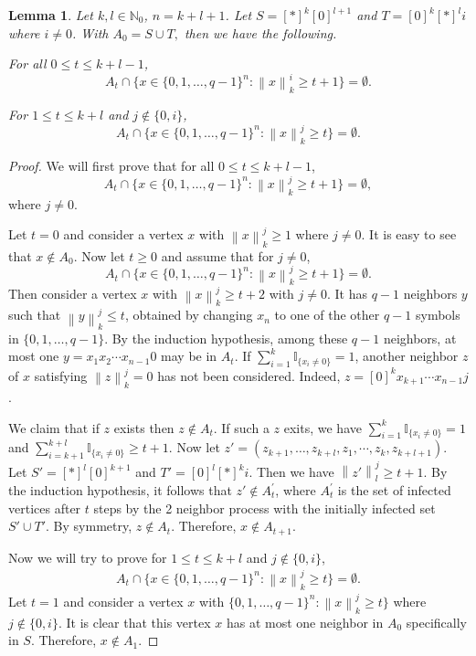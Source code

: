 \documentclass[reqno,11pt]{amsart}
\newtheorem{lemma}[theorem]{Lemma}
\renewcommand{\leq}{\leqslant}
\renewcommand{\geq}{\geqslant}
\begin{document}
\begin{lemma} \label{lemma:ST5}
Let $k,l \in \mathbb{N}_0$, $n=k+l+1$. Let $S=[*]^k[0]^{l+1}$ and $T=[0]^k[*]^li$ where $i \neq 0$. With $A_0=S \cup T,$ then we have the following.

For all $0 \leq t \leq k+l-1$,
$$A_t \cap \{x \in \{0,1,\dots,q-1\}^n: \left \lVert x \right \rVert_{k}^i \geq t+1\}=\emptyset.$$

For $1 \leq t \leq k+l$ and $j \notin \{0,i\}$,
$$A_t \cap \{x \in \{0,1,\dots,q-1\}^n: \left \lVert x \right \rVert_{k}^j \geq t\}=\emptyset.$$

\end{lemma}
\begin{proof}
We will first prove that for all $ 0 \leq t \leq k+l-1$,
$$A_t \cap \{x \in \{0,1,\dots,q-1\}^n: \left \lVert x \right \rVert_{k}^j \geq t+1\}=\emptyset,$$
where $j \neq 0$.


Let $t=0$ and consider a vertex $x$ with $\left \lVert x \right \rVert_{k}^j \geq 1$ where $j \neq 0$. It is easy to see that $x \notin A_0$. 
Now let $t \geq 0$ and assume that for $j \neq 0$, 
$$A_{t} \cap \{x \in \{0,1,\dots,q-1\}^n: \left \lVert x \right \rVert_{k}^j \geq t+1\}=\emptyset.$$
Then consider a vertex $x$ with $\left \lVert x \right \rVert_{k}^j \geq t+2$ with $j \neq 0$. It has $q-1$ neighbors $y$ such that $\left \lVert y \right \rVert_{k}^j \leq t$, obtained by changing $x_n$ to one of the other $q-1$ symbols in $\{0,1,\dots,q-1\}$. By the induction hypothesis, among these $q-1$ neighbors, at most one $y=x_1x_2\cdots x_{n-1}0$ may be in $A_{t}$. 
If $\sum_{i=1}^k\mathbb{I}_{\{x_i \neq 0\}} =1$, another neighbor $z$ of $x$ satisfying $\left \lVert z \right \rVert_{k}^j=0$ has not been considered. Indeed, $z=[0]^{k}x_{k+1}\cdots x_{n-1}j$.

We claim that if $z$ exists then $z \notin A_{t}$. If such a $z$ exits, we have $\sum_{i=1}^k\mathbb{I}_{\{x_i \neq 0\}}=1$ and $\sum_{i=k+1}^{k+l}\mathbb{I}_{\{x_i \neq 0\}}\geq t+1$. Now let $z'=(z_{k+1},\dots,z_{k+l},z_1,\cdots,z_k,z_{k+l+1})$. Let $S'=[\ast]^l[0]^{k+1}$ and $T'=[0]^l[\ast]^ki$. Then we have $\left \lVert z' \right \rVert_{l}^j \geq t+1.$ By the induction hypothesis, it follows that $z' \notin A^{'}_t$, where $A^{'}_t$ is the set of infected vertices after $t$ steps by the 2 neighbor process with the initially infected set $S' \cup T'$. By symmetry, $z \notin A_t$. Therefore, $x \notin A_{t+1}$. 

Now we will try to prove for $1 \leq t \leq k+l$ and $j \notin \{0,i\}$,
\begin{align}
A_t \cap \{x \in \{0,1,\dots,q-1\}^n: \left \lVert x \right \rVert_{k}^j \geq t\}=\emptyset. \label{eq:jk>t}
\end{align}
Let $t=1$ and consider a vertex $x$ with $\{0,1,\dots,q-1\}^n: \left \lVert x \right \rVert_{k}^j \geq t\}$ where $j \notin \{0,i\}$. It is clear that this vertex $x$ has at most one neighbor in $A_0$ specifically in $S$. Therefore, $x \notin A_1$. 


\end{proof}
\end{document}
